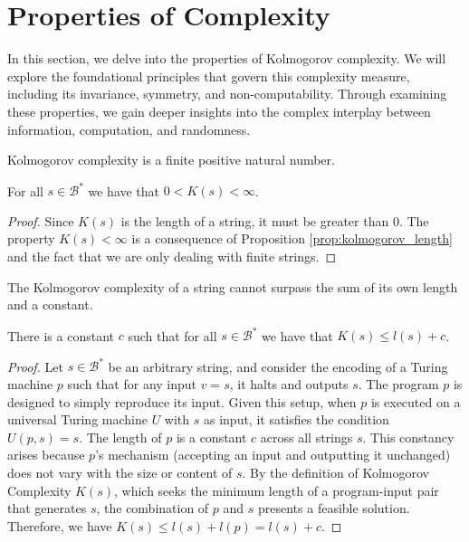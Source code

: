 %
%

\section{Properties of Complexity}

In this section, we delve into the properties of Kolmogorov complexity. We will explore the foundational principles that govern this complexity measure, including its invariance, symmetry, and non-computability. Through examining these properties, we gain deeper insights into the complex interplay between information, computation, and randomness.

Kolmogorov complexity is a finite positive natural number.

\begin{proposition}
For all $s\in\mathcal{B}^{\ast}$ we have that $0 < K(s) < \infty$.
\end{proposition}
\begin{proof}
Since $K(s)$ is the length of a string, it must be greater than $0$. The property $K(s) < \infty$ is a consequence of Proposition \ref{prop:kolmogorov_length} and the fact that we are only dealing with finite strings.
\end{proof}

The Kolmogorov complexity of a string cannot surpass the sum of its own length and a constant.

\begin{proposition}
\label{prop:kolmogorov_length}
There is a constant $c$ such that for all $s\in\mathcal{B}^{\ast}$ we have that $K(s) \leq l(s) + c$.
\end{proposition}
\begin{proof}
Let $s \in \mathcal{B}^\ast$ be an arbitrary string, and consider the encoding of a Turing machine $p$ such that for any input $v = s$, it halts and outputs $s$. The program $p$ is designed to simply reproduce its input. Given this setup, when $p$ is executed on a universal Turing machine $U$ with $s$ as input, it satisfies the condition $U(p, s) = s$. The length of \(p\) is a constant $c$ across all strings $s$. This constancy arises because $p$'s mechanism (accepting an input and outputting it unchanged) does not vary with the size or content of $s$. By the definition of Kolmogorov Complexity $K(s)$, which seeks the minimum length of a program-input pair that generates $s$, the combination of $p$ and $s$ presents a feasible solution. Therefore, we have $K(s) \leq l(s) + l(p) = l(s) + c$.
\end{proof}

